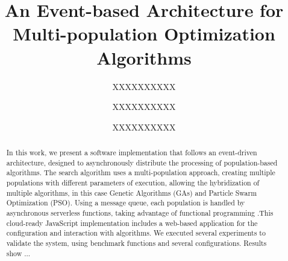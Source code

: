 \documentclass[runningheads]{llncs}
\begin{document}
%
\title{An Event-based Architecture for Multi-population Optimization Algorithms}
%
%
\author{XXXXXXXXXX \and
XXXXXXXXXX \and
XXXXXXXXXX}
%
%
%
\maketitle              %
%
\begin{abstract}
  In this work, we present a software implementation that follows an
  event-driven architecture, designed to asynchronously distribute the
  processing of population-based algorithms. The search algorithm uses a
  multi-population approach, creating multiple populations with different
  parameters of execution, allowing the hybridization of multiple algorithms, in
  this case Genetic Algorithms (GAs) and Particle Swarm Optimization (PSO).
  Using a message queue, each population is handled by asynchronous
  serverless functions, taking advantage of functional programming
    .This cloud-ready JavaScript implementation includes a web-based
    application for
    the configuration and interaction with algorithms. We executed
    several
    experiments to validate the system, using benchmark functions and
    several configurations. Results show ...





\end{abstract}
%
%
%
\end{document}
